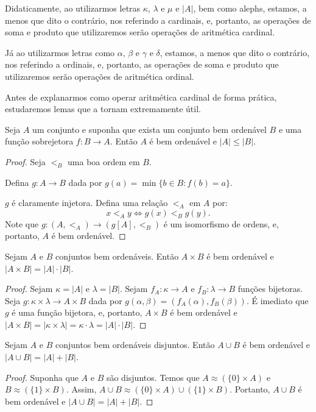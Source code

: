 Didaticamente, ao utilizarmos letras $\kappa$, $\lambda$ e $\mu$ e $|A|$, bem como alephs, estamos, a menos que dito o contrário, nos referindo a cardinais, e, portanto, as operações de soma e produto que utilizaremos serão operações de aritmética cardinal.

Já ao utilizarmos letras como $\alpha$, $\beta$ e $\gamma$ e $\delta$, estamos, a menos que dito o contrário, nos referindo a ordinais, e, portanto, as operações de soma e produto que utilizaremos serão operações de aritmética ordinal.

Antes de explanarmos como operar aritmética cardinal de forma prática, estudaremos lemas que a tornam extremamente útil.

\begin{lemma}
    Seja $A$ um conjunto e suponha que exista um conjunto bem ordenável $B$ e uma função sobrejetora $f:B\to A$.
    Então $A$ é bem ordenável e $|A|\leq |B|$.
\end{lemma}
\begin{proof}
    Seja $<_B$ uma boa ordem em $B$.

    Defina $g: A\to B$ dada por $g(a)=\min\{ b \in B: f(b)=a\}$.

    $g$ é claramente injetora.
    Defina uma relação $<_A$ em $A$ por:
    \[
    x <_A y \iff g(x) <_B g(y).
    \]
    Note que $g: (A, <_A) \to (g[A], <_B)$ é um isomorfismo de ordens, e, portanto, $A$ é bem ordenável.
\end{proof}

\begin{lemma}
Sejam $A$ e $B$ conjuntos bem ordenáveis.
Então $A\times B$ é bem ordenável e $|A\times B|=|A|\cdot |B|$.
\end{lemma}
\begin{proof}
    Sejam $\kappa=|A|$ e $\lambda=|B|$.
    Sejam $f_A: \kappa \to A$ e $f_B: \lambda \to B$ funções bijetoras.
    Seja $g: \kappa \times \lambda \to A\times B$ dada por $g(\alpha, \beta) = (f_A(\alpha), f_B(\beta))$.
    É imediato que $g$ é uma função bijetora, e, portanto, $A\times B$ é bem ordenável e $|A\times B|=|\kappa \times \lambda|=\kappa \cdot \lambda = |A|\cdot |B|$.
\end{proof}

\begin{lemma}
Sejam $A$ e $B$ conjuntos bem ordenáveis disjuntos.
Então $A\cup B$ é bem ordenável e $|A\cup B|=|A|+|B|$.
\end{lemma}
\begin{proof}
    Suponha que $A$ e $B$ são disjuntos.
    Temos que $A\approx(\{0\}\times A)$ e $B\approx(\{1\}\times B)$.
    Assim, $A\cup B \approx (\{0\}\times A)\cup (\{1\}\times B)$.
    Portanto, $A\cup B$ é bem ordenável e $|A\cup B|=|A|+|B|$.
\end{proof}

